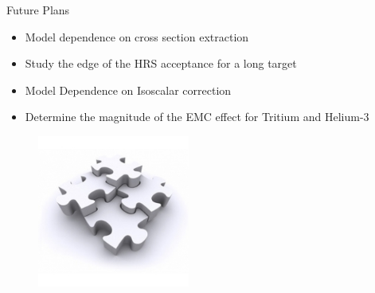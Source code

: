 \documentclass[12pt]{beamer}
\begin{document}
\begin{frame}{}
\begin{block}{Future Plans}
	\begin{itemize}
		\item Model dependence on cross section extraction
		\item Study the edge of the HRS acceptance for a long target 
		\item Model Dependence on Isoscalar correction
		\item Determine the magnitude of the EMC effect for Tritium and Helium-3
	\end{itemize}
\end{block}

\begin{figure}
	\includegraphics[width =5cm]{../images/puzzels.jpg}
\end{figure}

\end{frame}


\end{document}

